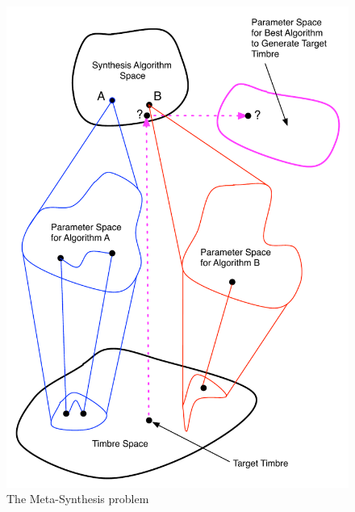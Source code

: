 \documentclass[a4paper,12pt]{report} 	%
\numberwithin{figure}{chapter}
\numberwithin{table}{chapter}
\numberwithin{equation}{chapter}
\begin{document}
\begin{flushleft}
\begin{figure}[h!]
\begin{center}
\includegraphics[scale=0.80]{MetaSynthesis1}
\caption[The Meta-Synthesis Problem]{The Meta-Synthesis problem}
\end{center}
\end{figure}

\end{flushleft}
\end{document}
